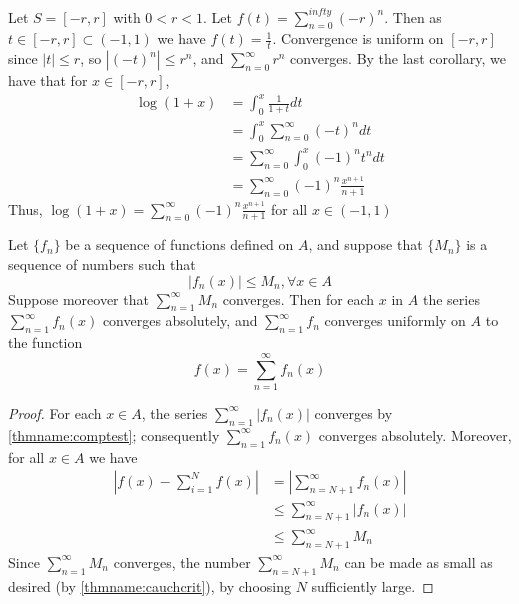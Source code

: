 \begin{eg}
    Let $S = [-r,r]$ with $0 < r < 1$. Let $f(t) = \sum_{n=0}^{infty}(-r)^n$. Then as $t \in [-r,r] \subset ( -1,1)$ we have $f(t) = \frac{1}{t}$. Convergence is uniform on $[-r,r]$ since $|t| \leq r$, so $|(-t)^n| \leq r^n$, and $\sum_{n=0}^{\infty}r^n$ converges. By the last corollary, we have that for $x \in [-r,r]$, \begin{align*}
        \log(1+x) &= \int_0^x\frac{1}{1+t}dt \tag{by the FTC} \\
        &= \int_0^x\sum_{n=0}^{\infty}(-t)^ndt \\
        &= \sum_{n=0}^{\infty}\int_0^x(-1)^nt^ndt \\
        &= \sum_{n=0}^{\infty}(-1)^n\frac{x^{n+1}}{n+1} \tag{by the FTC}
    \end{align*}
    Thus, $\log(1+x) = \sum_{n=0}^{\infty}(-1)^n\frac{x^{n+1}}{n+1}$ for all $x \in (-1,1)$
\end{eg}



\begin{namthm}\label{thmname:mtest}
    Let $\{f_n\}$ be a sequence of functions defined on $A$, and suppose that $\{M_n\}$ is a sequence of numbers such that \begin{equation*}
        |f_n(x)|\leq M_n,\forall x \in A
    \end{equation*}
    Suppose moreover that $\sum\limits_{n=1}^{\infty}M_n$ converges. Then for each $x$ in $A$ the series $\sum\limits_{n=1}^{\infty}f_n(x)$ converges absolutely, and $\sum\limits_{n=1}^{\infty}f_n$ converges uniformly on $A$ to the function \begin{equation*}
        f(x) = \sum\limits_{n=1}^{\infty}f_n(x)
    \end{equation*}
\end{namthm}
\begin{proof}
    For each $x \in A$, the series $\sum\limits_{n=1}^{\infty}|f_n(x)|$ converges by \ref{thmname:comptest}; consequently $\sum\limits_{n=1}^{\infty}f_n(x)$ converges absolutely. Moreover, for all $x \in A$ we have \begin{align*}
        \left|f(x) - \sum\limits_{i=1}^{N}f(x)\right| &= \left|\sum\limits_{n=N+1}^{\infty}f_n(x)\right| \\
        &\leq \sum\limits_{n=N+1}^{\infty}|f_n(x)| \\
        &\leq \sum\limits_{n=N+1}^{\infty}M_n
    \end{align*}
    Since $\sum\limits_{n=1}^{\infty}M_n$ converges, the number $\sum\limits_{n=N+1}^{\infty}M_n$ can be made as small as desired (by \ref{thmname:cauchcrit}), by choosing $N$ sufficiently large.
\end{proof}


